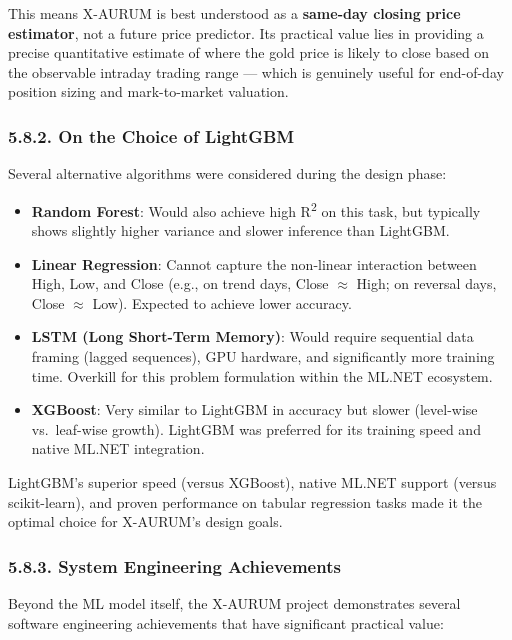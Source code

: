 This means X-AURUM is best understood as a \textbf{same-day closing price estimator}, not a future price predictor. Its practical value lies in providing a precise quantitative estimate of where the gold price is likely to close based on the observable intraday trading range --- which is genuinely useful for end-of-day position sizing and mark-to-market valuation.

\subsubsection{5.8.2. On the Choice of LightGBM}
Several alternative algorithms were considered during the design phase:

\begin{itemize}
  \item \textbf{Random Forest}: Would also achieve high R\textsuperscript{2} on this task, but typically shows slightly higher variance and slower inference than LightGBM.
  \item \textbf{Linear Regression}: Cannot capture the non-linear interaction between High, Low, and Close (e.g., on trend days, Close $\approx$ High; on reversal days, Close $\approx$ Low). Expected to achieve lower accuracy.
  \item \textbf{LSTM (Long Short-Term Memory)}: Would require sequential data framing (lagged sequences), GPU hardware, and significantly more training time. Overkill for this problem formulation within the ML.NET ecosystem.
  \item \textbf{XGBoost}: Very similar to LightGBM in accuracy but slower (level-wise vs.\ leaf-wise growth). LightGBM was preferred for its training speed and native ML.NET integration.
\end{itemize}

LightGBM's superior speed (versus XGBoost), native ML.NET support (versus scikit-learn), and proven performance on tabular regression tasks made it the optimal choice for X-AURUM's design goals.

\subsubsection{5.8.3. System Engineering Achievements}
Beyond the ML model itself, the X-AURUM project demonstrates several software engineering achievements that have significant practical value:

